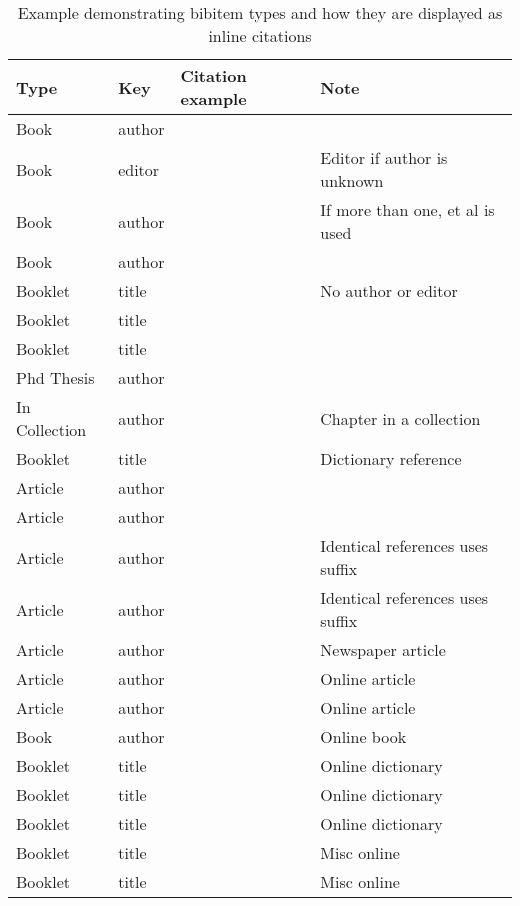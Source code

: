 \begin{table}[h]
\caption{Example demonstrating bibitem types and how they are displayed as inline citations}
\footnotesize
\begin{tabular}{l l l l}
Type & Key & Citation example & Note \\
\hline
Book           & author & \citet{bj08} \\
Book           & editor & \citet{ma07}     & Editor if author is unknown \\
Book           & author & \citet{bes08}    & If more than one, et al is used \\
Book           & author & \citet{chr08} \\
Booklet        & title  & \citet{kk96}     & No author or editor \\
Booklet        & title  & \citet{ss08} \\
Booklet        & title  & \citet{yo07} \\
Phd Thesis     & author & \citet{ms08} \\
In Collection  & author & \citet{ue07}     & Chapter in a collection \\
Booklet        & title  & \citet{so93}     & Dictionary reference\\
Article        & author & \citet{jh08} \\
Article        & author & \citet{jk08} \\
Article        & author & \citet{js08a}    & Identical references uses suffix\\
Article        & author & \citet{js08b}    & Identical references uses suffix\\
Article        & author & \citet{mb09}     & Newspaper article \\
Article        & author & \citet{sd06}     & Online article\\
Article        & author & \citet{vak04}    & Online article\\
Book           & author & \citet{pc03}     & Online book\\
Booklet        & title  & \citet{eb09}     & Online dictionary\\
Booklet        & title  & \citet{ne09}     & Online dictionary\\
Booklet        & title  & \citet{oed98}    & Online dictionary\\
Booklet        & title  & \citet{um09}     & Misc online\\
Booklet        & title  & \citet{ff09}     & Misc online\\

\end{tabular}
\end{table}
